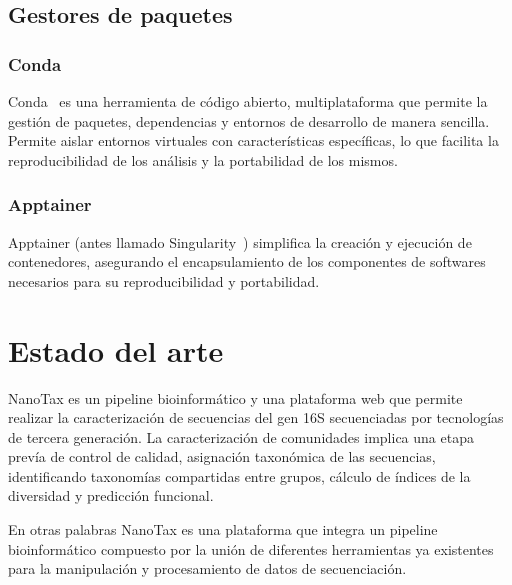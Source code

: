\subsection{Gestores de paquetes}
\subsubsection{Conda}
Conda~\cite{anaconda}  es una herramienta de código abierto, multiplataforma  que permite la gestión de paquetes, dependencias y entornos de desarrollo de manera sencilla. Permite aislar entornos virtuales con características específicas, lo que facilita la reproducibilidad de los análisis y la portabilidad de los mismos.
\subsubsection{Apptainer}
Apptainer (antes llamado Singularity~\cite{kurtzer2017singularity}) simplifica la creación y ejecución de contenedores, asegurando el encapsulamiento de los componentes de softwares necesarios para su reproducibilidad y portabilidad.  


\section{Estado del arte}


NanoTax es un pipeline bioinformático y una plataforma web que permite realizar la caracterización de secuencias del gen 16S secuenciadas por tecnologías de tercera generación.
La caracterización de comunidades implica una etapa prevía de control de calidad,  asignación taxonómica de las secuencias, identificando taxonomías compartidas entre grupos, cálculo de índices de la diversidad y predicción funcional.

En otras palabras NanoTax es una plataforma que integra un pipeline bioinformático compuesto por la unión de diferentes herramientas ya existentes para la manipulación y procesamiento de datos de secuenciación.

